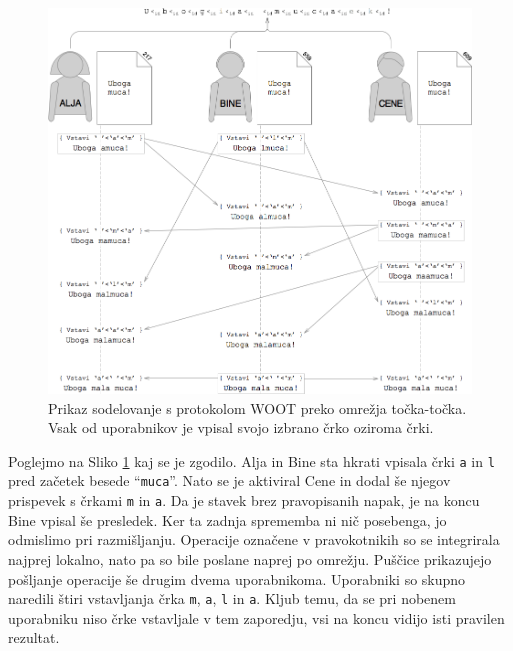 \documentclass[a4paper, 12pt, twoside]{book}
\begin{document}
\begin{figure}[placement h]
\begin{center}
\includegraphics[width=13cm]{woot6.png}
\end{center}
\caption{Prikaz sodelovanje s protokolom WOOT preko omrežja točka-točka. Vsak od uporabnikov je vpisal svojo izbrano črko oziroma črki.}
\label{woot6}
\end{figure}

Poglejmo na Sliko \ref{woot6} kaj se je zgodilo. Alja in Bine sta hkrati vpisala črki {\tt a} in {\tt l} pred začetek besede “{\tt muca}”. Nato se je aktiviral Cene in dodal še njegov prispevek s črkami {\tt m} in {\tt a}. Da je stavek brez pravopisanih napak, je na koncu Bine vpisal še presledek. Ker ta zadnja sprememba ni nič posebenga, jo odmislimo pri razmišljanju. Operacije označene v pravokotnikih so se integrirala najprej lokalno, nato pa so bile poslane naprej po omrežju. Puščice prikazujejo pošljanje operacije še drugim dvema uporabnikoma. Uporabniki so skupno naredili štiri vstavljanja črka {\tt m}, {\tt a}, {\tt l} in {\tt a}. Kljub temu, da se pri nobenem uporabniku niso črke vstavljale v tem zaporedju, vsi na koncu vidijo isti pravilen rezultat.
\end{document}
